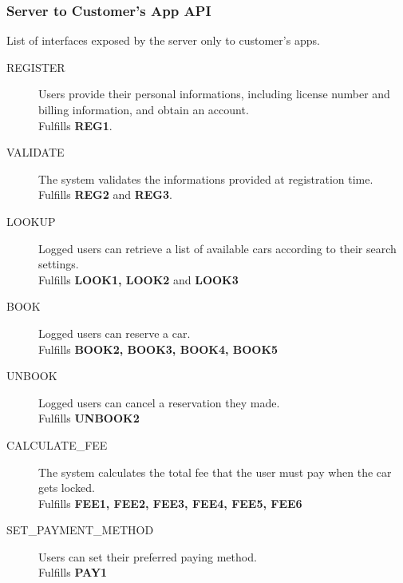 \documentclass[11pt]{article} %
\begin{document}
\begin{description}
\subsubsection{Server to Customer's App API}
List of interfaces exposed by the server only to customer's apps.
\begin{description}
	\item[REGISTER] Users provide their personal informations, including license number and billing information, and obtain an account. \\ Fulfills \textbf{REG1}.
	\item[VALIDATE] The system validates the informations provided at registration time. \\ Fulfills \textbf{REG2} and \textbf{REG3}.
	\item[LOOKUP] Logged users can retrieve a list of available cars according to their search settings.\\ Fulfills \textbf{LOOK1, LOOK2} and \textbf{LOOK3} 
	\item[BOOK] Logged users can reserve a car. \\ Fulfills \textbf{BOOK2, BOOK3, BOOK4, BOOK5 }	
	\item[UNBOOK] Logged users can cancel a reservation they made. \\ Fulfills \textbf{UNBOOK2}	
	\item[CALCULATE\_FEE] The system calculates the total fee that the user must pay when the car gets locked. \\ Fulfills \textbf{FEE1, FEE2, FEE3, FEE4, FEE5, FEE6}	
	\item[SET\_PAYMENT\_METHOD] Users can set their preferred paying method. \\ Fulfills \textbf{PAY1}
\end{description}



\end{description}
\end{document}

